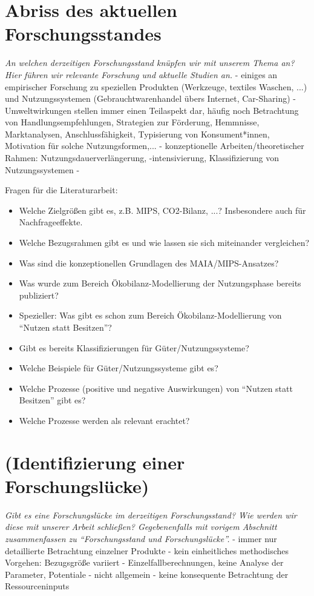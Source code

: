 \documentclass[11pt, titlepage=true]{scrartcl} %
\newcommand{\was}[1]{\small\textit{#1}}
\begin{document}
\section{Abriss des aktuellen Forschungsstandes}
\was{An welchen derzeitigen Forschungsstand knüpfen wir mit unserem Thema an? Hier führen wir relevante Forschung und aktuelle Studien an.}
- einiges an empirischer Forschung zu speziellen Produkten (Werkzeuge, textiles Waschen, ...) und Nutzungssystemen (Gebrauchtwarenhandel übers Internet, Car-Sharing)
- Umweltwirkungen stellen immer einen Teilaspekt dar, häufig noch Betrachtung von Handlungsempfehlungen, Strategien zur Förderung, Hemmnisse, Marktanalysen, Anschlussfähigkeit, Typisierung von Konsument*innen, Motivation für solche Nutzungsformen,...
- konzeptionelle Arbeiten/theoretischer Rahmen: Nutzungsdauerverlängerung, -intensivierung, Klassifizierung von Nutzungssystemen
- 


Fragen für die Literaturarbeit:
\begin{itemize}
	\item Welche Zielgrößen gibt es, z.B. MIPS, CO2-Bilanz, ...? Insbesondere auch für Nachfrageeffekte.
	\item Welche Bezugsrahmen gibt es und wie lassen sie sich miteinander vergleichen?
	\item Was sind die konzeptionellen Grundlagen des MAIA/MIPS-Ansatzes?
	
	\item Was wurde zum Bereich Ökobilanz-Modellierung der Nutzungsphase bereits publiziert?
	\item Spezieller: Was gibt es schon zum Bereich Ökobilanz-Modellierung von \enquote{Nutzen statt Besitzen}?
	
	\item Gibt es bereits Klassifizierungen für Güter/Nutzungssysteme?
	\item Welche Beispiele für Güter/Nutzungssysteme gibt es?
	
	\item Welche Prozesse (positive und negative Auswirkungen) von \enquote{Nutzen statt Besitzen} gibt es?
	\item Welche Prozesse werden als relevant erachtet?
\end{itemize}

 \section{(Identifizierung einer Forschungslücke)}
 \was{Gibt es eine Forschungslücke im derzeitigen Forschungsstand? Wie werden wir
 diese mit unserer Arbeit schließen?
 Gegebenenfalls mit vorigem Abschnitt zusammenfassen zu \enquote{Forschungsstand und Forschungslücke}.}
 - immer nur detaillierte Betrachtung einzelner Produkte
 - kein einheitliches methodisches Vorgehen: Bezugsgröße variiert
 - Einzelfallberechnungen, keine Analyse der Parameter, Potentiale
 - nicht allgemein
 - keine konsequente Betrachtung der Ressourceninputs
 
\end{document}
